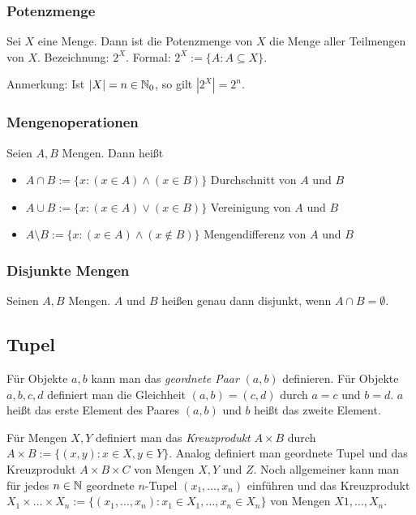 \subsubsection{Potenzmenge}

Sei $ X $ eine Menge. Dann ist die Potenzmenge von $ X $ die Menge aller Teilmengen von $ X $. Bezeichnung: $ 2^X $. Formal: $ 2^X := \{ A : A \subseteq X \} $. 

Anmerkung: Ist $ | X | = n \in \mathbb N_0$, so gilt $| 2^X | = 2^n $.


\subsubsection{Mengenoperationen}

Seien $ A,B $ Mengen. Dann heißt
\begin{itemize}
\item $ A \cap B := \{ x : (x \in A) \wedge (x \in B) \} $ Durchschnitt von $ A $ und $ B $
\item $ A \cup B := \{ x : (x \in A) \vee (x \in B) \} $ Vereinigung von $ A $ und $ B $
\item $ A \setminus B := \{ x : (x \in A) \wedge (x \notin B) \} $ Mengendifferenz von $ A $ und $ B $
\end{itemize}

\subsubsection{Disjunkte Mengen}

Seinen $ A,B $ Mengen. $ A $ und $ B $ heißen genau dann disjunkt, wenn $ A \cap B = \emptyset $.

\subsection{Tupel}

Für Objekte $ a,b $ kann man das \emph{geordnete Paar} $ (a,b) $ definieren. Für Objekte $ a,b,c,d $ definiert man die Gleichheit $ (a,b) = (c,d) $ durch $ a=c $ und $ b=d $. $ a $ heißt das erste Element des Paares $ (a,b) $ und $ b $ heißt das zweite Element.

Für Mengen $ X,Y $ definiert man das \emph{Kreuzprodukt} $ A \times B $ durch $ A \times B := \{ (x,y) : x \in X, y \in Y \} $. Analog definiert man geordnete Tupel und das Kreuzprodukt $ A \times B \times C $ von Mengen $ X,Y $ und $ Z $. Noch allgemeiner kann man für jedes $ n \in \mathbb N $ geordnete $ n $-Tupel $ (x_1,\ldots,x_n) $ einführen und das Kreuzprodukt $ X_1 \times \ldots \times X_n := \{ (x_1,\ldots,x_n) : x_1 \in X_1, \ldots , x_n \in X_n \} $ von Mengen $ X1,\ldots,X_n $.

